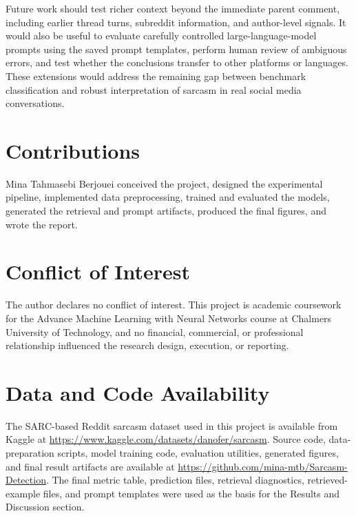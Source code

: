 \documentclass[%
 reprint,
 amsmath,amssymb,
 aps,
]{revtex4-2}
\begin{document}
Future work should test richer context beyond the immediate parent comment, including earlier thread turns, subreddit information, and author-level signals. It would also be useful to evaluate carefully controlled large-language-model prompts using the saved prompt templates, perform human review of ambiguous errors, and test whether the conclusions transfer to other platforms or languages. These extensions would address the remaining gap between benchmark classification and robust interpretation of sarcasm in real social media conversations.

\section{\label{sec:Contribution}Contributions} %

Mina Tahmasebi Berjouei conceived the project, designed the experimental pipeline, implemented data preprocessing, trained and evaluated the models, generated the retrieval and prompt artifacts, produced the final figures, and wrote the report.

\section{\label{sec:COI}Conflict of Interest} %

The author declares no conflict of interest. This project is academic coursework for the Advance Machine Learning with Neural Networks course at Chalmers University of Technology, and no financial, commercial, or professional relationship influenced the research design, execution, or reporting.

\section{\label{sec:datacode}Data and Code Availability} %

The SARC-based Reddit sarcasm dataset used in this project is available from Kaggle at \url{https://www.kaggle.com/datasets/danofer/sarcasm}. Source code, data-preparation scripts, model training code, evaluation utilities, generated figures, and final result artifacts are available at \url{https://github.com/mina-mtb/Sarcasm-Detection}. The final metric table, prediction files, retrieval diagnostics, retrieved-example files, and prompt templates were used as the basis for the Results and Discussion section.

\end{document}
